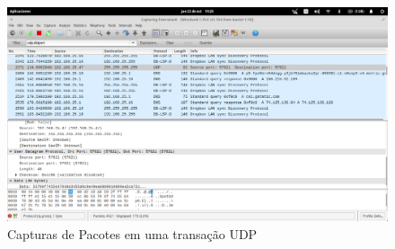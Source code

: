   \begin{figure}[h]
    \centering

    \includegraphics[width=450px, scale=1]{figuras/udp}
    \caption{Capturas de Pacotes em uma transação UDP}

 \label{fig:dns}
  \end{figure}